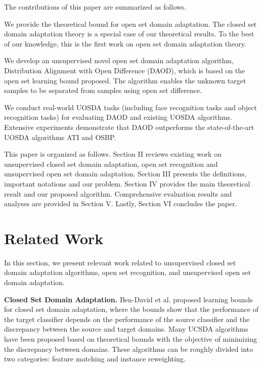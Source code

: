 \documentclass[journal]{IEEEtran}
\begin{document}
The contributions of this paper are summarized as
follows.

  We provide the theoretical bound  for open set domain adaptation. The closed set domain adaptation theory \cite{DBLP:conf/nips/Ben-DavidBCP06} is a special case of our theoretical results. To the best of our
knowledge, this is the first work on open set domain adaptation theory. 



 We develop an unsupervised novel open set domain adaptation algorithm, Distribution Alignment with Open Difference (DAOD), which is based on the open set learning bound proposed.  The algorithm enables  the unknown target samples to be separated from samples using open set difference. 

  We conduct  real-world UOSDA tasks (including  face recognition tasks and  object recognition tasks) for evaluating DAOD and existing UOSDA algorithms. Extensive experiments demonstrate that DAOD outperforms the state-of-the-art UOSDA algorithms ATI and OSBP.  

This paper is organized as follows. Section II reviews existing work on unsupervised closed set domain adaptation, open set recognition and unsupervised open set domain adaptation. Section III presents the definitions, important notations and our problem. Section IV provides the main theoretical result and our proposed algorithm. Comprehensive evaluation results and analyses are provided in Section V. Lastly, Section VI concludes the paper. 



\section{Related Work}
In this section, we present relevant work related to unsupervised closed set domain adaptation algorithms, open set recognition, and unsupervised open set domain adaptation.

\textbf{Closed Set Domain Adaptation.} Ben-David et al.\cite{DBLP:conf/nips/Ben-DavidBCP06} proposed learning bounds for closed set domain adaptation, where the bounds show that the performance of the target classifier depends on the performance of the source classifier and the discrepancy between the source and target domains. Many UCSDA algorithms \cite{long2014transfer,DBLP:journals/tnn/LiSH17,DBLP:journals/tnn/DengLOTCZ19,liu2019butterfly} have been proposed based on theoretical bounds with the objective of minimizing the discrepancy between domains. These algorithms can be roughly divided into two categories: feature matching and instance reweighting.
\end{document}

